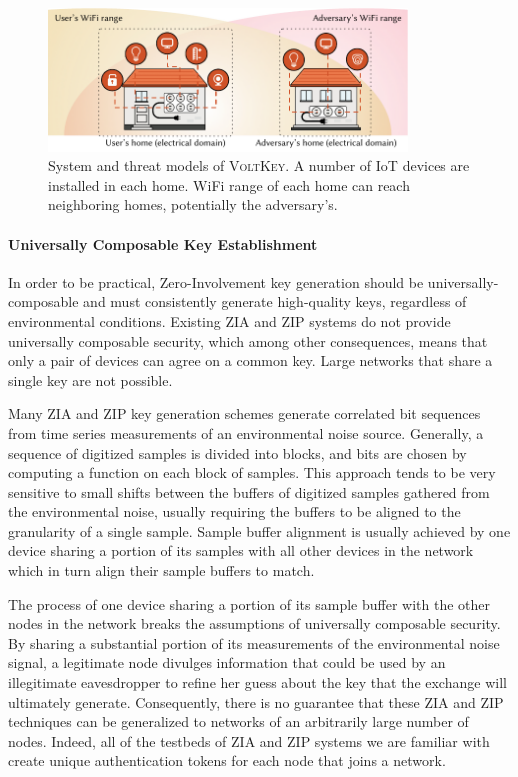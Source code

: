 \documentclass[10pt,onecolumn]{article}
\begin{document}
\begin{figure}
\centering
\includegraphics[width=3.75in]{figures/introduction.pdf}
\caption{System and threat models of \textsc{VoltKey}. A number of IoT devices are installed in each home. WiFi range of each home can reach neighboring homes, potentially the adversary's.}
\label{fig:introduction}
\end{figure}


\paragraph{Universally Composable Key Establishment}

In order to be practical, Zero-Involvement key generation should be universally-composable and must consistently generate high-quality keys, regardless of environmental conditions.
Existing ZIA and ZIP systems do not provide universally composable security, which among other consequences, means that only a pair of devices can agree on a common key.
Large networks that share a single key are not possible.


Many ZIA and ZIP key generation schemes generate correlated bit sequences from time series measurements of an environmental noise source.
Generally, a sequence of digitized samples is divided into blocks, and bits are chosen by computing a function on each block of samples\cite{voltkey,Lin-H2B,Lee-WiSec20}.
This approach tends to be very sensitive to small shifts between the buffers of digitized samples gathered from the environmental noise, usually requiring the buffers to be aligned to the granularity of a single sample.
Sample buffer alignment is usually achieved by one device sharing a portion of its samples with all other devices in the network which in turn align their sample buffers to match.


The process of one device sharing a portion of its sample buffer with the other nodes in the network breaks the assumptions of universally composable security.
By sharing a substantial portion of its measurements of the environmental noise signal, a legitimate node divulges information that could be used by an illegitimate eavesdropper to refine her guess about the key that the exchange will ultimately generate.
Consequently, there is no guarantee that these ZIA and ZIP techniques can be generalized to networks of an arbitrarily large number of nodes.
Indeed, all of the testbeds of ZIA and ZIP systems we are familiar with create unique authentication tokens for each node that joins a network.
\end{document}
